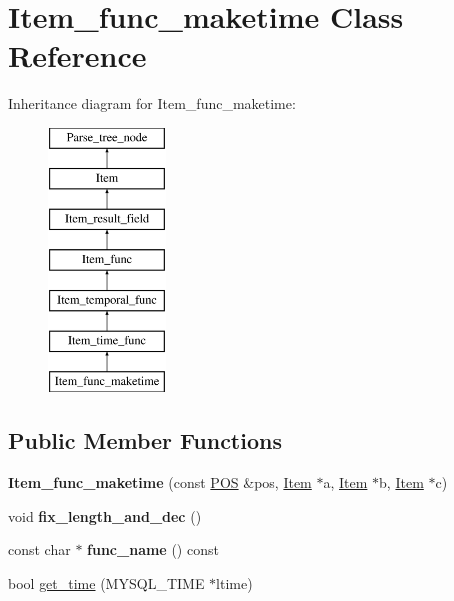 \hypertarget{classItem__func__maketime}{}\section{Item\+\_\+func\+\_\+maketime Class Reference}
\label{classItem__func__maketime}
Inheritance diagram for Item\+\_\+func\+\_\+maketime\+:\begin{figure}[H]
\begin{center}
\leavevmode
\includegraphics[height=7.000000cm]{classItem__func__maketime}
\end{center}
\end{figure}
\subsection*{Public Member Functions}
\begin{DoxyCompactItemize}
\item 
\mbox{\label{classItem__func__maketime_ad7d3ce772098c03e031b0cd8cf0d69a2}} 
{\bfseries Item\+\_\+func\+\_\+maketime} (const \mbox{\hyperlink{structYYLTYPE}{P\+OS}} \&pos, \mbox{\hyperlink{classItem}{Item}} $\ast$a, \mbox{\hyperlink{classItem}{Item}} $\ast$b, \mbox{\hyperlink{classItem}{Item}} $\ast$c)
\item 
\mbox{\label{classItem__func__maketime_a3170af3857be98161858586622ccf984}} 
void {\bfseries fix\+\_\+length\+\_\+and\+\_\+dec} ()
\item 
\mbox{\label{classItem__func__maketime_ac361e5d31ef4a0b47f07dfc7481ac7e1}} 
const char $\ast$ {\bfseries func\+\_\+name} () const
\item 
bool \mbox{\hyperlink{classItem__func__maketime_adce1c69b807be74e21df99c158c84903}{get\+\_\+time}} (M\+Y\+S\+Q\+L\+\_\+\+T\+I\+ME $\ast$ltime)
\end{DoxyCompactItemize}
